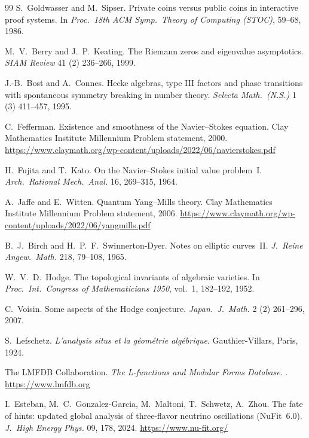 \documentclass[11pt,a4paper]{amsart}
\theoremstyle{plain}
\theoremstyle{definition}
\begin{document}
\begin{thebibliography}{99}
S.~Goldwasser and M.~Sipser.
\newblock Private coins versus public coins in interactive proof systems.
\newblock In \emph{Proc.\ 18th ACM Symp.\ Theory of Computing (STOC)}, 59--68, 1986.

M.~V.~Berry and J.~P.~Keating.
\newblock The Riemann zeros and eigenvalue asymptotics.
\newblock \emph{SIAM Review} 41 (2) 236--266, 1999.

J.-B.~Bost and A.~Connes.
\newblock Hecke algebras, type III factors and phase transitions with spontaneous symmetry breaking in number theory.
\newblock \emph{Selecta Math.\ (N.S.)} 1 (3) 411--457, 1995.

C.~Fefferman.
\newblock Existence and smoothness of the Navier--Stokes equation.
\newblock Clay Mathematics Institute Millennium Problem statement, 2000.
\newblock \url{https://www.claymath.org/wp-content/uploads/2022/06/navierstokes.pdf}

H.~Fujita and T.~Kato.
\newblock On the Navier--Stokes initial value problem~I.
\newblock \emph{Arch.\ Rational Mech.\ Anal.} 16, 269--315, 1964.

A.~Jaffe and E.~Witten.
\newblock Quantum Yang--Mills theory.
\newblock Clay Mathematics Institute Millennium Problem statement, 2006.
\newblock \url{https://www.claymath.org/wp-content/uploads/2022/06/yangmills.pdf}

B.~J.~Birch and H.~P.~F.~Swinnerton-Dyer.
\newblock Notes on elliptic curves~II.
\newblock \emph{J.\ Reine Angew.\ Math.} 218, 79--108, 1965.

W.~V.~D.~Hodge.
\newblock The topological invariants of algebraic varieties.
\newblock In \emph{Proc.\ Int.\ Congress of Mathematicians 1950}, vol.~1, 182--192, 1952.

C.~Voisin.
\newblock Some aspects of the Hodge conjecture.
\newblock \emph{Japan.\ J.\ Math.} 2 (2) 261--296, 2007.

S.~Lefschetz.
\newblock \emph{L'analysis situs et la g\'eom\'etrie alg\'ebrique}.
\newblock Gauthier-Villars, Paris, 1924.

The LMFDB Collaboration.
\newblock \emph{The L-functions and Modular Forms Database}.
. \url{https://www.lmfdb.org}

I.~Esteban, M.~C.~Gonzalez-Garcia, M.~Maltoni, T.~Schwetz, A.~Zhou.
\newblock The fate of hints: updated global analysis of three-flavor neutrino oscillations (NuFit~6.0).
\newblock \emph{J.\ High Energy Phys.} 09, 178, 2024. \url{https://www.nu-fit.org/}


\end{thebibliography}
\end{document}
